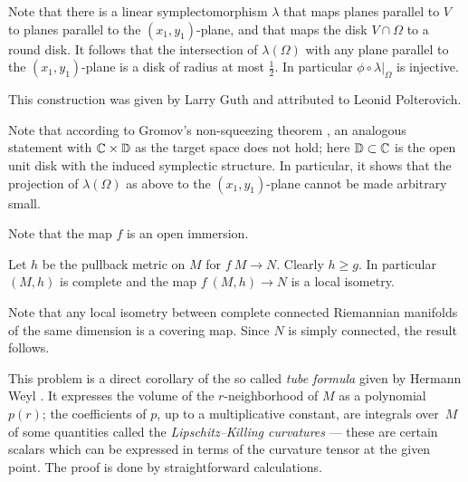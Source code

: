 Note that there is a linear symplectomorphism $\lambda$ that maps planes parallel to $V$ to planes parallel to the $(x_1,y_1)$-plane, and that maps the disk $V\cap\Omega$ to a round disk.
It follows that the intersection of $\lambda(\Omega)$ 
with any plane parallel to the $(x_1,y_1)$-plane is a disk of radius at most $\tfrac 12$.
In particular $\phi\circ\lambda|_\Omega$
is injective.\qeds

This construction was given 
by Larry Guth \cite{guth-symplectic}
and attributed to Leonid Polterovich.

Note that according to Gromov's non-squeezing theorem \cite{gromov-pseudoholomorphic}, 
an analogous statement with $\mathbb{C}\times \mathbb{D}$ as the target space does not hold;
here $\mathbb{D}\subset \mathbb{C}$ is the open unit disk with the induced symplectic structure.
In particular, it shows that
the projection of $\lambda(\Omega)$ as above 
to the $(x_1,y_1)$-plane
cannot be made arbitrary small.

Note that the map $f$ is an open immersion.

Let $h$ be the pullback metric on $M$ for $f\:M\to N$.
Clearly $h\ge g$.
In particular $(M,h)$ is complete and the map $f\:(M,h)\to N$ is a local isometry. 

Note that any local isometry between complete connected Riemannian manifolds of the same dimension is a covering map.
Since $N$ is simply connected, the result follows.
\qeds 


This problem is a direct corollary of the so called \emph{tube formula} given by Hermann Weyl \cite{weyl}.
It expresses the volume of the $r$-neighborhood of $M$ as a polynomial $p(r)$;
the coefficients of $p$, up to a multiplicative constant, are integrals over~$M$ of some quantities called the \emph{Lipschitz--Killing curvatures} --- these are certain scalars which can be expressed in terms of the curvature tensor at the given point.
The proof is done by straightforward calculations.

 


